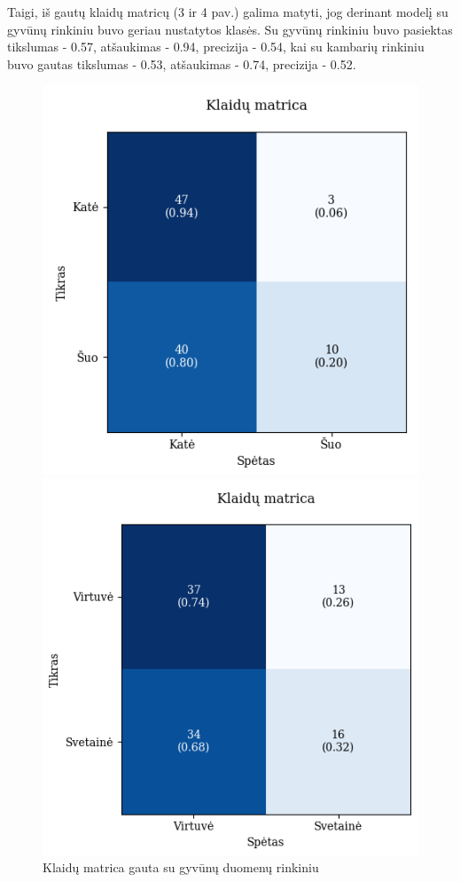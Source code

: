 \documentclass{VUMIFPSbakalaurinis}
\begin{document}
Taigi, iš gautų klaidų matricų (3 ir 4 pav.) galima matyti, jog derinant modelį su gyvūnų rinkiniu buvo geriau nustatytos klasės. 
Su gyvūnų rinkiniu buvo pasiektas tikslumas - 0.57, atšaukimas - 0.94, precizija - 0.54, kai su kambarių rinkiniu buvo gautas tikslumas - 0.53, atšaukimas - 0.74, precizija - 0.52.
\begin{figure}[!htbp]
    \centering
    \begin{minipage}[b]{0.48\textwidth}
      \includegraphics[width=\textwidth]{img/GrapthsNEW/Small/animal/5/KM_DC_S_5.png}
      \caption{Klaidų matrica gauta su gyvūnų duomenų rinkiniu}
    \end{minipage}
    \hspace{2mm}
    \begin{minipage}[b]{0.48\textwidth}
      \includegraphics[width=\textwidth]{img/GrapthsNEW/Small/room/5/KM_R_S_5.png}

\end{minipage}
\end{figure}
\end{document}
